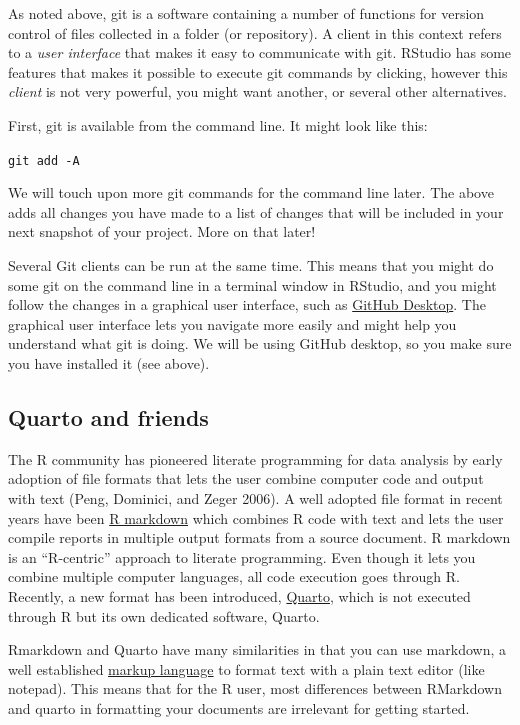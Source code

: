 \documentclass[
  11pt,
  letterpaper,
]{scrbook}
\begin{document}
As noted above, git is a software containing a number of functions for
version control of files collected in a folder (or repository). A client
in this context refers to a \emph{user interface} that makes it easy to
communicate with git. RStudio has some features that makes it possible
to execute git commands by clicking, however this \emph{client} is not
very powerful, you might want another, or several other alternatives.

First, git is available from the command line. It might look like this:

\texttt{git\ add\ -A}

We will touch upon more git commands for the command line later. The
above adds all changes you have made to a list of changes that will be
included in your next snapshot of your project. More on that later!

Several Git clients can be run at the same time. This means that you
might do some git on the command line in a terminal window in RStudio,
and you might follow the changes in a graphical user interface, such as
\href{https://desktop.github.com/}{GitHub Desktop}. The graphical user
interface lets you navigate more easily and might help you understand
what git is doing. We will be using GitHub desktop, so you make sure you
have installed it (see above).

\hypertarget{quarto-and-friends}{%
\subsection{Quarto and friends}\label{quarto-and-friends}}

The R community has pioneered literate programming for data analysis by
early adoption of file formats that lets the user combine computer code
and output with text (Peng, Dominici, and Zeger 2006). A well adopted
file format in recent years have been
\href{https://rmarkdown.rstudio.com/}{R markdown} which combines R code
with text and lets the user compile reports in multiple output formats
from a source document. R markdown is an ``R-centric'' approach to
literate programming. Even though it lets you combine multiple computer
languages, all code execution goes through R. Recently, a new format has
been introduced, \href{https://quarto.org/}{Quarto}, which is not
executed through R but its own dedicated software, Quarto.

Rmarkdown and Quarto have many similarities in that you can use
markdown, a well established
\href{https://en.wikipedia.org/wiki/Markdown}{markup language} to format
text with a plain text editor (like notepad). This means that for the R
user, most differences between RMarkdown and quarto in formatting your
documents are irrelevant for getting started.
\end{document}
